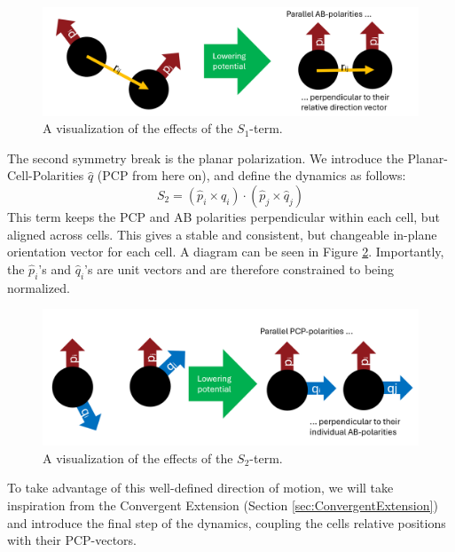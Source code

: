 
\begin{figure}[H]
    \centering
    \includegraphics[width=1\linewidth]{chapters//Theory//figures/explainS1.png}
    \caption{A visualization of the effects of the $S_1$-term.}
    \label{fig:explain-S1}
\end{figure}

The second symmetry break is the planar polarization. We introduce the Planar-Cell-Polarities $\hat{q}$ (PCP from here on), and define the dynamics as follows:
\begin{equation*}
    S_2=\left(\hat{p}_i \times \hat{q}_{i}\right) \cdot\left(\hat{p}_j \times \hat{q}_{j}\right)
\end{equation*}
This term keeps the PCP and AB polarities perpendicular within each cell, but aligned across cells. This gives a stable and consistent, but changeable in-plane orientation vector for each cell. A diagram can be seen in Figure \ref{fig:explain-S2}. Importantly, the $\hat{p}_i$'s and $\hat{q}_i$'s are unit vectors and are therefore constrained to being normalized.\\
\begin{figure}[H]
    \centering
    \includegraphics[width=1\linewidth]{chapters//Theory//figures/explainS2.png}
    \caption{A visualization of the effects of the $S_2$-term.}
    \label{fig:explain-S2}
\end{figure}
To take advantage of this well-defined direction of motion, we will take inspiration from the Convergent Extension (Section \ref{sec:ConvergentExtension}) and introduce the final step of the dynamics, coupling the cells relative positions with their PCP-vectors.


